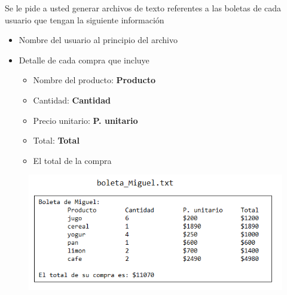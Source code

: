 Se le pide a usted generar archivos de texto referentes a las boletas de cada usuario que tengan la siguiente información
\begin{itemize}
    \item Nombre del usuario al principio del archivo
    \item Detalle de cada compra que incluye 
    \begin{itemize}
        \item Nombre del producto: \textbf{Producto}
        \item Cantidad: \textbf{Cantidad}
        \item Precio unitario: \textbf{P. unitario}
        \item Total: \textbf{Total}
    \item El total de la compra
    \end{itemize}
\end{itemize}

\begin{figure}[H]
    \centering
    \includegraphics{Imagenes/boletamia.png}
\end{figure}

